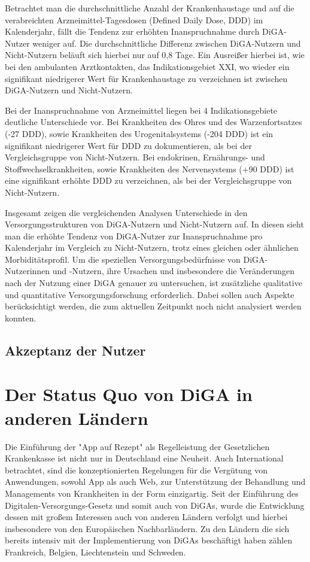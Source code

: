 \documentclass{article}
\begin{document}
			Betrachtet man die durchschnittliche Anzahl der Krankenhaustage und auf die verabreichten Arzneimittel-Tagesdosen (Defined Daily Dose, DDD) im Kalenderjahr, fällt die Tendenz zur erhöhten Inanspruchnahme durch DiGA-Nutzer weniger auf. Die durchschnittliche Differenz zwischen DiGA-Nutzern und Nicht-Nutzern beläuft sich hierbei nur auf 0,8 Tage. Ein Ausreißer hierbei ist, wie bei den ambulanten Arztkontakten, das Indikationsgebiet XXI, wo wieder ein signifikant niedrigerer Wert für Krankenhaustage zu verzeichnen ist zwischen DiGA-Nutzern und Nicht-Nutzern.\par
			Bei der Inanspruchnahme von Arzneimittel liegen bei 4 Indikationsgebiete deutliche Unterschiede vor. Bei Krankheiten des Ohres und des Warzenfortsatzes (-27 DDD), sowie Krankheiten des Urogenitalsystems (-204 DDD) ist ein signifikant niedrigerer Wert für DDD zu dokumentieren, als bei der Vergleichsgruppe von Nicht-Nutzern. Bei endokrinen, Ernährungs- und Stoffwechselkrankheiten, sowie Krankheiten des Nervensystems (+90 DDD) ist eine signifikant erhöhte DDD zu verzeichnen, als bei der Vergleichsgruppe von Nicht-Nutzern.\par
			Insgesamt zeigen die vergleichenden Analysen Unterschiede in den Versorgungsstrukturen von DiGA-Nutzern und Nicht-Nutzern auf. In diesen sieht man die erhöhte Tendenz von DiGA-Nutzer zur Inanspruchnahme pro Kalenderjahr im Vergleich zu Nicht-Nutzern, trotz eines gleichen oder ähnlichen Morbiditätsprofil. Um die speziellen Versorgungsbedürfnisse von DiGA-Nutzerinnen und -Nutzern, ihre Ursachen und insbesondere die Veränderungen nach der Nutzung einer DiGA genauer zu untersuchen, ist zusätzliche qualitative und quantitative Versorgungsforschung erforderlich. Dabei sollen auch Aspekte berücksichtigt werden, die zum aktuellen Zeitpunkt noch nicht analysiert werden konnten.
			
		\subsection{Akzeptanz der Nutzer}
				
	\section{Der Status Quo von DiGA in anderen Ländern}
		Die Einführung der "App auf Rezept" als Regelleistung der Gesetzlichen Krankenkasse ist nicht nur in Deutschland eine Neuheit. Auch International betrachtet, sind die konzeptionierten Regelungen für die Vergütung von Anwendungen, sowohl App als auch Web, zur Unterstützung der Behandlung und Managements von Krankheiten in der Form einzigartig. Seit der Einführung des Digitalen-Versorgungs-Gesetz und somit auch von DiGAs, wurde die Entwicklung dessen mit großem Interessen auch von anderen Ländern verfolgt und hierbei insbesondere von den Europäischen Nachbarländern. Zu den Ländern die sich bereits intensiv mit der Implementierung von DiGAs beschäftigt haben zählen Frankreich, Belgien, Liechtenstein und Schweden.\cite[vgl. S.25-26]{TK-diga-report-1}
		\newpage
\end{document}
